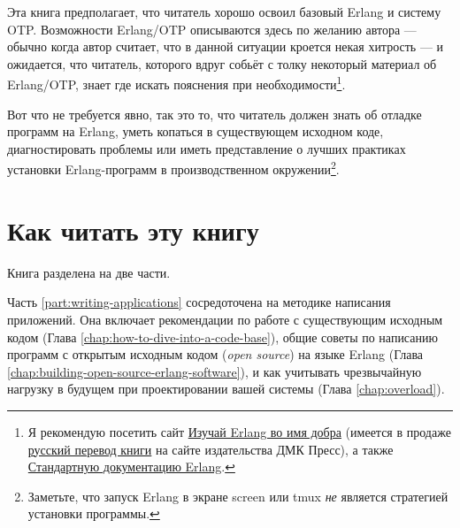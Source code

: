 Эта книга предполагает, что читатель хорошо освоил базовый Erlang и систему OTP. Возможности Erlang/OTP описываются здесь по желанию автора --- обычно когда автор считает, что в данной ситуации кроется некая хитрость --- и ожидается, что читатель, которого вдруг собьёт с толку некоторый материал об Erlang/OTP, знает где искать пояснения при необходимости\footnote{Я рекомендую посетить сайт \href{http://learnyousomeerlang.com}{Изучай Erlang во имя добра} (имеется в продаже \href{http://dmkpress.com/catalog/computer/programming/functional/978-5-97060-086-3/}{русский перевод книги} на сайте издательства ДМК Пресс), а также \href{http://www.erlang.org/erldoc}{Стандартную документацию Erlang}.}.

Вот что не требуется явно, так это то, что читатель должен знать об отладке программ на Erlang, уметь копаться в существующем исходном коде, диагностировать проблемы или иметь представление о лучших практиках установки Erlang-программ в производственном окружении\footnote{Заметьте, что запуск Erlang в экране screen или tmux \emph{не} является стратегией установки программы.}.


\section*{Как читать эту книгу}
\label{sec:how-to-read-this-book}

Книга разделена на две части.

Часть \ref{part:writing-applications} сосредоточена на методике написания приложений. Она включает рекомендации по работе с существующим исходным кодом (Глава \ref{chap:how-to-dive-into-a-code-base}), общие советы по написанию программ с открытым исходным кодом (\emph{open source}) на языке Erlang (Глава \ref{chap:building-open-source-erlang-software}), и как учитывать чрезвычайную нагрузку в будущем при проектировании вашей системы (Глава \ref{chap:overload}).


